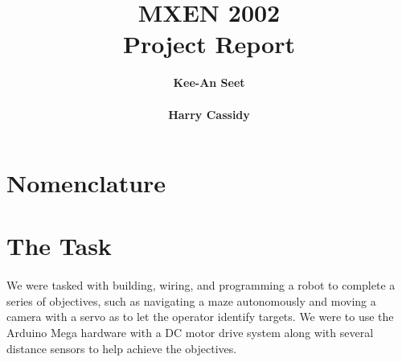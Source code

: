 \documentclass[12pt, a4paper]{article}
\title{
  \huge\textbf{MXEN 2002} \\
  \vspace{2em}
  \large\textbf{Project Report}\\
  \vspace{0.5em}
}
\author{
    \textbf{Kee-An Seet} \\
    \email{19776219@student.curtin.edu.au} \\
    \textbf{Harry Cassidy} \\
    \email{20607591@student.curtin.edu.au}
}
\date{}
\begin{document}
\maketitle
\pagebreak

\tableofcontents
\paragraph{}
\newpage
\listoffigures
\paragraph{}
\listoftables
\paragraph{}
\pagebreak


\section{Nomenclature}\label{sec:nomen}
\paragraph{}

\newpage
\section{The Task} \label{sec:intro}

\paragraph{}
  We were tasked with building, wiring, and programming a robot to complete a series of objectives, such as navigating a maze autonomously and moving a camera with a servo as to let the operator identify targets. We were to use the Arduino Mega hardware with a DC motor drive system along with several distance sensors to help achieve the objectives.
\end{document}
